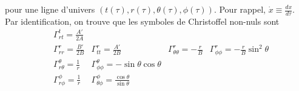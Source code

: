 \documentclass[a4paper,11pt]{report}
\theoremstyle{definition}
\theoremstyle{plain}
\theoremstyle{definition}
\theoremstyle{remark}
\begin{document}
        pour une ligne d'univers $(t(\tau),r(\tau),\theta(\tau),\phi(\tau))$. Pour rappel, $\dot{x}\equiv\frac{dx}{d\tau}$. Par identification, on trouve que les symboles de Christoffel non-nuls sont
        \begin{align}
            &\Gamma^t_{rt} = \frac{A'}{2A} & & & \\
            &\Gamma^r_{rr} = \frac{B'}{2B} &\Gamma^r_{tt} = \frac{A'}{2B} &\Gamma^r_{\theta\theta} = -\frac{r}{B} &\Gamma^r_{\phi\phi} = -\frac{r}{B}\sin^2\theta\\
            &\Gamma^\theta_{r\theta} = \frac{1}{r} &\Gamma^\theta_{\phi\phi} = -\sin\theta\cos\theta & & \\
            &\Gamma^\phi_{r\phi} = \frac{1}{r} &\Gamma^\phi_{\theta\phi} = \frac{\cos\theta}{\sin\theta} & &
        \end{align}
        
\end{document}

